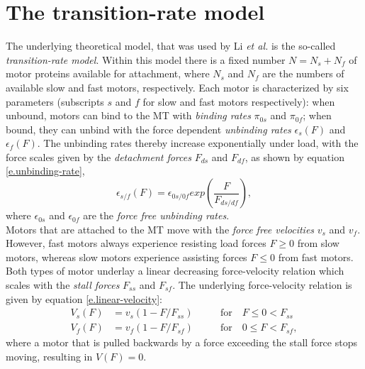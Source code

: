 \section{The transition-rate model}\label{s.transition-rates-model}
The underlying theoretical model, that was used by Li \textit{et al.} \cite{li} is the so-called \textit{transition-rate model}. Within this model there is a fixed number \mbox{$N = N_s + N_f$} of
motor proteins available for attachment, where $N_s$ and $N_f$ are the numbers of available slow and fast motors, respectively. Each motor is characterized by six parameters (subscripts $s$ and $f$
for slow and fast motors respectively): when unbound, motors can bind to the MT with \textit{binding rates} $\pi_{0s}$ and $\pi_{0f}$; when bound, they can unbind with the force dependent 
\textit{unbinding rates} $\epsilon_s\left(F\right)$ and $\epsilon_f\left(F\right)$. The unbinding rates thereby increase exponentially under load, with the force scales given by the 
\textit{detachment forces} $F_{ds}$ and $F_{df}$, as shown by equation \eqref{e.unbinding-rate},
\begin{equation}\label{e.unbinding-rate}
 \epsilon_{s/f}\left(F\right) = \epsilon_{0s/0f} exp\left({\frac{F}{F_{ds/df}}}\right),
\end{equation}
where $\epsilon_{0s}$ and $\epsilon_{0f}$ are the \textit{force free unbinding rates}.\\
Motors that are attached to the MT move with the \textit{force free velocities} $v_s$ and $v_f$. However, fast motors always experience resisting load forces \mbox{$F \geq 0$} from slow motors,
whereas slow motors experience assisting forces \mbox{$F \leq 0$} from fast motors. Both types of motor underlay a linear decreasing force-velocity relation which scales with the 
\textit{stall forces} $F_{ss}$ and $F_{sf}$. The underlying force-velocity relation is given by equation \eqref{e.linear-velocity}:
\begin{equation}\label{e.linear-velocity}
\begin{aligned}
 V_s\left(F\right) &= v_s \left(1 - F/F_{ss}\right) \qquad \phantom{_{ff}} \text{for} \quad F \leq 0 < F_{ss} \\
 V_f\left(F\right) &= v_f \left(1 - F/F_{sf}\right) \qquad \phantom{_{ss}} \text{for} \quad 0 \leq F < F_{sf},
\end{aligned}
\end{equation}
where a motor that is pulled backwards by a force exceeding the stall force stops moving, resulting in \mbox{$V\left(F\right) = 0$}.

